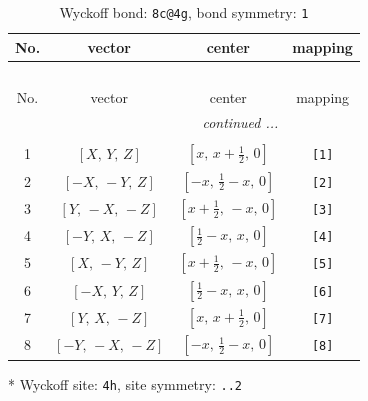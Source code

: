 \documentclass[fleqn,8pt]{jsarticle}
\begin{document}
\renewcommand{\arraystretch}{1.2}
\begin{longtable}{cccc}
\caption{Wyckoff bond: {\tt 8c@4g}, bond symmetry: {\tt 1}}
 \\
 \hline \hline
No. & vector & center & mapping \\ \hline \endfirsthead

\multicolumn{3}{l}{\tablename\ \thetable{}} \\
 \hline \hline
No. & vector & center & mapping \\ \hline \endhead

 \hline \hline
\multicolumn{3}{r}{\footnotesize\it continued ...} \\ \endfoot

 \hline \hline
\multicolumn{3}{r}{} \\ \endlastfoot

1 & $\left[ X,\, Y,\, Z \right]$ & $\left[ x,\, x + \frac{1}{2},\, 0 \right]$ & {\tt [1]} \\ \hline
2 & $\left[ - X,\, - Y,\, Z \right]$ & $\left[ - x,\, \frac{1}{2} - x,\, 0 \right]$ & {\tt [2]} \\ \hline
3 & $\left[ Y,\, - X,\, - Z \right]$ & $\left[ x + \frac{1}{2},\, - x,\, 0 \right]$ & {\tt [3]} \\ \hline
4 & $\left[ - Y,\, X,\, - Z \right]$ & $\left[ \frac{1}{2} - x,\, x,\, 0 \right]$ & {\tt [4]} \\ \hline
5 & $\left[ X,\, - Y,\, Z \right]$ & $\left[ x + \frac{1}{2},\, - x,\, 0 \right]$ & {\tt [5]} \\ \hline
6 & $\left[ - X,\, Y,\, Z \right]$ & $\left[ \frac{1}{2} - x,\, x,\, 0 \right]$ & {\tt [6]} \\ \hline
7 & $\left[ Y,\, X,\, - Z \right]$ & $\left[ x,\, x + \frac{1}{2},\, 0 \right]$ & {\tt [7]} \\ \hline
8 & $\left[ - Y,\, - X,\, - Z \right]$ & $\left[ - x,\, \frac{1}{2} - x,\, 0 \right]$ & {\tt [8]} \\
\end{longtable}
* Wyckoff site: {\tt 4h}, site symmetry: {\tt ..2}
\renewcommand{\arraystretch}{1.2}
\end{document}
